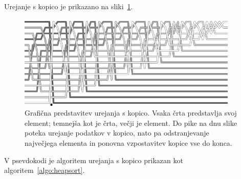 \documentclass[a4paper,oneside,12pt]{article}
\begin{document}
Urejanje s kopico je prikazano na sliki~\ref{fig:heapsortimage}.
\begin{figure}[ht]
    \begin{center}
        \includegraphics[height=45mm]{slike/Heap.png}
    \end{center}
    \vspace{-0.7cm}
    \caption[Urejanje s kopico]{Grafična predstavitev urejanja s kopico.
Vsaka črta predstavlja svoj element; temnejša kot je črta, večji je element.
Do pike na dnu slike poteka urejanje podatkov v kopico, nato pa odstranjevanje
največjega elementa in ponovna vzpostavitev kopice vse do konca.}
    \label{fig:heapsortimage}
\end{figure}

V psevdokodi je algoritem urejanja s kopico prikazan kot algoritem~\ref{algo:heapsort}.
\end{document}
